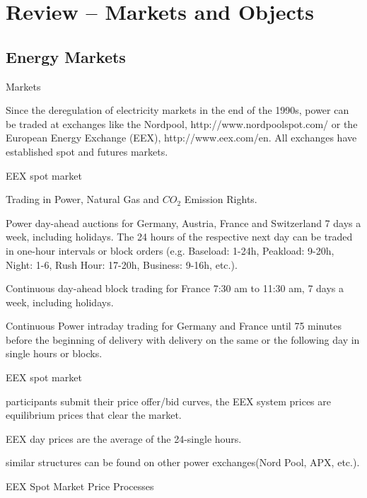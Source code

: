\section{Review -- Markets and Objects}
\subsection{Energy Markets}

{Markets}

Since the deregulation of electricity markets in the end of the
1990s, power can be traded at exchanges like the Nordpool, http://www.nordpoolspot.com/  or the
European Energy Exchange (EEX), http://www.eex.com/en. All exchanges have established
spot and futures markets.


{EEX spot market}
\item<1->Trading in Power, Natural Gas and $CO_2$ Emission Rights.
\item<2->Power day-ahead auctions for Germany, Austria, France and Switzerland 7 days a week, including holidays. The 24 hours of the respective next day can be traded in one-hour intervals or block orders (e.g. Baseload: 1-24h, Peakload: 9-20h, Night: 1-6, Rush Hour: 17-20h, Business: 9-16h, etc.).
\item<3-> Continuous day-ahead block trading for France 7:30 am to 11:30 am, 7 days a week, including holidays.
\item<4->Continuous Power intraday trading for Germany and France until 75 minutes before the beginning of delivery with delivery on the same or the following day in single hours or blocks.

{EEX spot market}
\item<1-> participants submit their price offer/bid curves, the EEX system prices are equilibrium prices that clear the market.
\item<2-> EEX day prices are the average of the 24-single hours.
\item<3-> similar structures can be found on other power exchanges(Nord Pool, APX, etc.).

{EEX Spot Market Price Processes}

